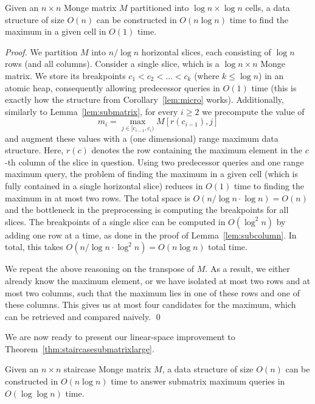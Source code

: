 \documentclass{llncs}
\begin{document}
\begin{lemma}
\label{lem:cellmaximum}
Given an $n\times n$ Monge matrix $M$ partitioned into $\log n \times \log n$ cells, a data structure
of size $O(n)$ can be constructed in $O(n\log n)$ time to find the maximum in a given cell in $O(1)$ time.
\end{lemma}

\begin{proof}
We partition $M$ into $n/\log n$ horizontal slices, each consisting of $\log n$ rows (and all columns). Consider a single slice,
which is a $\log n \times n $ Monge matrix.
We store its breakpoints $c_{1}<c_{2}<\ldots < c_{k}$ (where $k \le \log n$) in an atomic heap,
consequently allowing predecessor queries in $O(1)$ time (this is exactly how the structure from
Corollary~\ref{lem:micro} works). Additionally, similarly to Lemma~\ref{lem:submatrix}, for every $i\geq 2$
we precompute the value of
$$m_{i}=\max_{j\in [c_{i-1},c_{i})} M[r(c_{i-1}),j]$$
and augment these values with a (one dimensional) range maximum data structure. Here, $r(c)$ denotes the row containing
the maximum element in the $c$-th column of the slice in question. 
Using two predecessor queries
and one range maximum query, the problem of finding the maximum in a given cell
(which is fully contained in a single horizontal slice) reduces in $O(1)$ time to finding the maximum in at most two rows.
The total space is $O(n/\log n \cdot \log n)=O(n)$ and the bottleneck
in the preprocessing is computing the breakpoints for all slices.
The breakpoints of a single slice can be computed in $O(\log ^2 n)$ by
adding one row at a time, as done in the proof of
Lemma~\ref{lem:subcolumn}. In total, this  takes $O(n/\log n \cdot \log^2
n)=O(n\log n)$ total time. 

We repeat the above reasoning on the transpose of $M$. As a result, we either already know the maximum
element, or we have isolated at most two rows and at most two columns, such that the maximum lies in one of these rows and one of these columns. This gives us at most four candidates
for the maximum, which can be retrieved and compared naively. \qed
\end{proof}

\noindent We are now ready to present our linear-space improvement to  Theorem~\ref{thm:staircasesubmatrixlarge}.

\begin{theorem}
\label{thm:staircasesubmatrix}
Given an $n\times n$ staircase Monge matrix $M$, a data structure of size $O(n)$ can be constructed
in $O(n\log n)$ time to answer submatrix maximum queries in $O(\log\log n)$ time.
\end{theorem}
\end{document}
